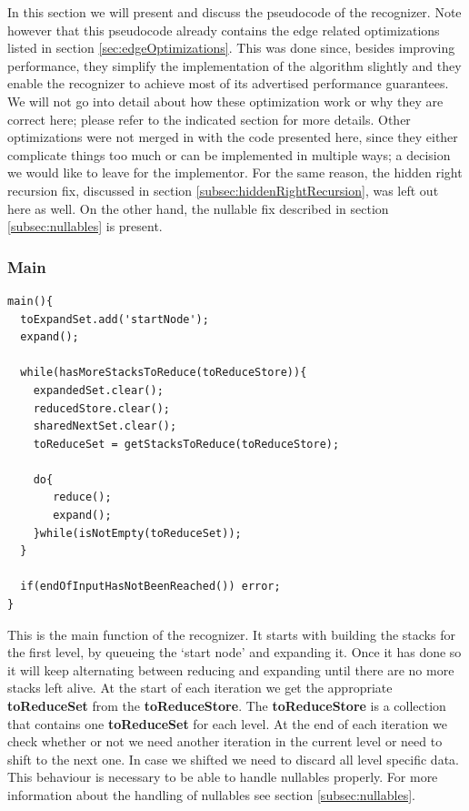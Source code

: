 \documentclass[a4paper,10pt]{article}
\begin{document}
In this section we will present and discuss the pseudocode of the recognizer. Note however that this pseudocode already contains the edge related optimizations listed in section \ref{sec:edgeOptimizations}. This was done since, besides improving performance, they simplify the implementation of the algorithm slightly and they enable the recognizer to achieve most of its advertised performance guarantees. We will not go into detail about how these optimization work or why they are correct here; please refer to the indicated section for more details. Other optimizations were not merged in with the code presented here, since they either complicate things too much or can be implemented in multiple ways; a decision we would like to leave for the implementor. For the same reason, the hidden right recursion fix, discussed in section \ref{subsec:hiddenRightRecursion}, was left out here as well. On the other hand, the nullable fix described in section \ref{subsec:nullables} is present.

\subsubsection{Main}
{\small
\begin{verbatim}
main(){
  toExpandSet.add('startNode');
  expand();
  
  while(hasMoreStacksToReduce(toReduceStore)){
    expandedSet.clear();
    reducedStore.clear();
    sharedNextSet.clear();
    toReduceSet = getStacksToReduce(toReduceStore);
    
    do{
       reduce();
       expand();
    }while(isNotEmpty(toReduceSet));
  }
  
  if(endOfInputHasNotBeenReached()) error;
}
\end{verbatim}
}

This is the main function of the recognizer. It starts with building the stacks for the first level, by queueing the `start node' and expanding it. Once it has done so it will keep alternating between reducing and expanding until there are no more stacks left alive. At the start of each iteration we get the appropriate {\bf toReduceSet} from the {\bf toReduceStore}. The {\bf toReduceStore} is a collection that contains one {\bf toReduceSet} for each level. At the end of each iteration we check whether or not we need another iteration in the current level or need to shift to the next one. In case we shifted we need to discard all level specific data. This behaviour is necessary to be able to handle nullables properly. For more information about the handling of nullables see section \ref{subsec:nullables}.
\end{document}
